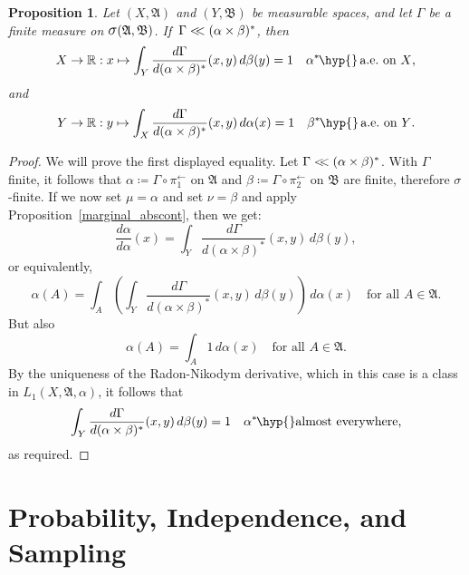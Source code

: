 \documentclass[
twoside=true,
paper=letter,
fontsize=9pt,
pagesize=auto,
leqno,
openany,
headsepline,
overfullrule,
]{scrbook}
\theoremstyle{plain}
\theoremstyle{plain}
\newtheorem{prop}[thm]{Proposition}
\theoremstyle{definition}
\theoremstyle{bfnoteitalic}
\theoremstyle{bfnoteroman}
\newcommand{\sigalg}[1]{\mathfrak{#1}}
\newcommand{\definedby}{\coloneqq}
\newcommand{\sagb}{\mathop{\hbox{\large{$\sigma$}}}\nolimits}
\newcommand{\textsigma}{\hbox{\large{$\sigma$}}\kern-1pt}
\newcommand{\preimage}[1]{#1^{\leftarrow}}
\newcommand{\R}{\mathbb{R}}
\newcommand{\sigmaalgebra}{\sigalg{A}}
\newcommand{\sigmaalgebraii}{\sigalg{B}}
\newcommand{\productsig}[2]{\sagb(#1,#2)}
\newcommand{\kernast}{\ast\kern-1pt}
\newcommand{\measurespace}{X}
\newcommand{\measurespaceii}{Y}
\newcommand{\mspaceelt}{x}
\newcommand{\mspaceeltii}{y}
\newcommand{\abscont}{\mathrel{< \kern-3.5pt <}}
\newcommand{\measmu}{\mu}
\newcommand{\measnu}{\nu}
\newcommand{\seti}{A}
\newcommand{\projectionone}{\pi_1}
\newcommand{\projectiontwo}{\pi_2}
\newcommand{\measonprod}{\Gamma}%
\newcommand{\marginalone}{\alpha}%
\newcommand{\marginaltwo}{\beta}%
\begin{document}
\begin{prop}\label{almost_a_measure}
Let
$(\measurespace, \sigmaalgebra)$
and
$(\measurespaceii, \sigmaalgebraii)$
be measurable spaces, and let  $\measonprod$ be a finite measure on
$\productsig{\sigmaalgebra}{\sigmaalgebraii}$.
If\, $\measonprod \abscont (\marginalone\times\marginaltwo)^*$, then
\[
\measurespace\to\R
:\mspaceelt\mapsto
\int_\measurespaceii \dfrac{d\measonprod}{d(\marginalone\times\marginaltwo)^*}
(\mspaceelt,\mspaceeltii)
\,d\marginaltwo(\mspaceeltii)
=
1
\quad
\text{$\marginalone^\kernast$\hyp{}\,a.e.\ on $\measurespace$,}
\]
and
\[
\measurespaceii\to\R:\mspaceeltii\mapsto
\int_\measurespace \dfrac{d\measonprod}{d(\marginalone\times\marginaltwo)^*}
(\mspaceelt,\mspaceeltii)
\,d\marginalone(\mspaceelt)
=
1
\quad
\text{$\marginaltwo^\kernast$\hyp{}\,a.e.\ on $\measurespaceii$.}
\]
\end{prop}
\begin{proof}
We will prove the first displayed equality.
Let $\measonprod\abscont(\marginalone\times\marginaltwo)^*$.
With $\measonprod$ finite, it follows that
$\marginalone\definedby
\measonprod \circ \preimage{\projectionone}$
on $\sigmaalgebra$
and
$\marginaltwo\definedby
\measonprod \circ \preimage{\projectiontwo}$
on $\sigmaalgebraii$
are finite, therefore \textsigma\hyp{}finite.
If we now set
$\measmu = \marginalone$
and set
$\measnu=\marginaltwo$ and apply Proposition~\ref{marginal_abscont}, then we get:
\[
\frac{d \marginalone}{d\marginalone}(\mspaceelt)
=
\int_{\measurespaceii}
\frac{d\measonprod}{d(\marginalone\times\marginaltwo)^*}
(\mspaceelt,\mspaceeltii)
\,d\marginaltwo(\mspaceeltii),
\]
or equivalently,
\[
\marginalone(\seti)
=
\int_\seti
\left(
\int_{\measurespaceii}
\frac{d\measonprod}{d(\marginalone\times\marginaltwo)^*}
(\mspaceelt,\mspaceeltii)
\,d\marginaltwo(\mspaceeltii)
\right)
\,d\marginalone(\mspaceelt)\quad\text{for all $\seti\in\sigmaalgebra$.}
\]
But also
\[
\marginalone(\seti)
=
\int_\seti
1
\,d\marginalone(\mspaceelt)\quad\text{for all $\seti\in\sigmaalgebra$.}
\]
By the uniqueness of the Radon-Nikodym derivative, which in this case is a class in
$L_1(\measurespace, \sigmaalgebra,\marginalone)$, it follows that
\[
\int_{\measurespaceii}
\frac{d\measonprod}{d(\marginalone\times\marginaltwo)^*}
(\mspaceelt,\mspaceeltii)
\,d\marginaltwo(\mspaceeltii)
= 1
\quad
\text{$\marginalone^\kernast$\hyp{}almost everywhere,}
\]
as required.
\end{proof}


\chapter{Probability, Independence, and Sampling}
\end{document}
